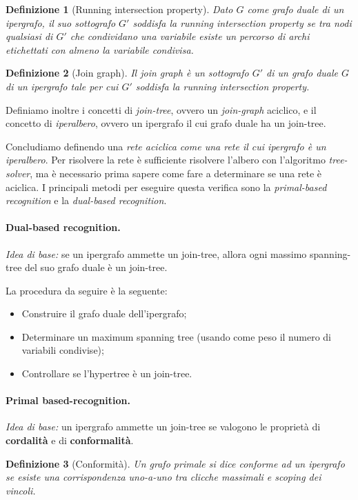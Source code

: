 \documentclass[a4paper, 11pt]{article}
\newtheorem{definit}{Definizione}[subsection]
\begin{document}
\begin{definit}[Running intersection property]
	Dato $G$ come grafo duale di un ipergrafo, il suo sottografo $G'$ soddisfa la running intersection property se tra nodi qualsiasi di $G'$ che condividano una variabile esiste un percorso di archi etichettati con almeno la variabile condivisa.
\end{definit}

\begin{definit}[Join graph]
	Il join graph è un sottografo $G'$ di un grafo duale $G$ di un ipergrafo tale per cui $G'$ soddisfa la running intersection property.
\end{definit}

Definiamo inoltre i concetti di \textit{join-tree}, ovvero un \textit{join-graph} aciclico, e il concetto di \textit{iperalbero}, ovvero un ipergrafo il cui grafo duale ha un join-tree.

Concludiamo definendo una \textit{rete aciclica come una rete il cui ipergrafo è un iperalbero}. 
Per risolvere la rete è sufficiente risolvere l'albero con l'algoritmo \textit{tree-solver}, ma è necessario prima sapere come fare a determinare se una rete è aciclica. I principali metodi per eseguire questa verifica sono la \textit{primal-based recognition} e la \textit{dual-based recognition}.

\paragraph{Dual-based recognition.} \textit{Idea di base:} se un ipergrafo ammette un join-tree, allora ogni massimo spanning-tree del suo grafo duale è un join-tree.

La procedura da seguire è la seguente: \begin{itemize}
	\item Construire il grafo duale dell'ipergrafo;
	\item Determinare un maximum spanning tree (usando come peso il numero di variabili condivise);
	\item Controllare se l'hypertree è un join-tree.
\end{itemize}

\paragraph{Primal based-recognition.} \textit{Idea di base:} un ipergrafo ammette un join-tree se valogono le proprietà di \textbf{cordalità} e di \textbf{conformalità}.
\begin{definit}[Conformità]
	Un grafo primale si dice conforme ad un ipergrafo se esiste una corrispondenza uno-a-uno tra clicche massimali e scoping dei vincoli.
\end{definit}
\end{document}
